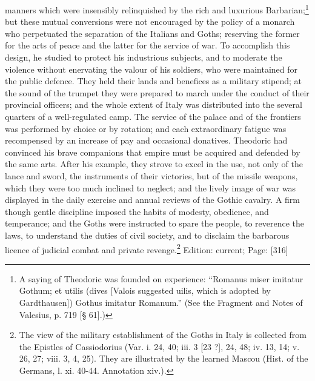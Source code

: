 manners which were insensibly relinquished by the rich and luxurious Barbarian;\footnote{A saying of Theodoric was founded on experience: \texthebrew{“}Romanus miser imitatur Gothum; et utilis (dives [Valois suggested uilis, which is adopted by Gardthausen]) Gothus imitatur Romanum.\texthebrew{}” (See the Fragment and Notes of Valesius, p. 719 [§ 61].)} but these mutual conversions were not encouraged by the policy of a monarch who perpetuated the separation of the Italians and Goths; reserving the former for the arts of peace and the latter for the service of war. To accomplish this design, he studied to protect his industrious subjects, and to moderate the violence without enervating the valour of his soldiers, who were maintained for the public defence. They held their lands and benefices as a military stipend; at the sound of the trumpet they were prepared to march under the conduct of their provincial officers; and the whole extent of Italy was distributed into the several quarters of a well-regulated camp. The service of the palace and of the frontiers was performed by choice or by rotation; and each extraordinary fatigue was recompensed by an increase of pay and occasional donatives. Theodoric had convinced his brave companions that empire must be acquired and defended by the same arts. After his example, they strove to excel in the use, not only of the lance and sword, the instruments of their victories, but of the missile weapons, which they were too much inclined to neglect; and the lively image of war was displayed in the daily exercise and annual reviews of the Gothic cavalry. A firm though gentle discipline imposed the habits of modesty, obedience, and temperance; and the Goths were instructed to spare the people, to reverence the laws, to understand the duties of civil society, and to disclaim the barbarous licence of judicial combat and private revenge.\footnote{The view of the military establishment of the Goths in Italy is collected from the Epistles of Cassiodorius (Var. i. 24, 40; iii. 3 [23 ?], 24, 48; iv. 13, 14; v. 26, 27; viii. 3, 4, 25). They are illustrated by the learned Mascou (Hist. of the Germans, l. xi. 40-44. Annotation xiv.).}
Edition: current; Page: [316]

